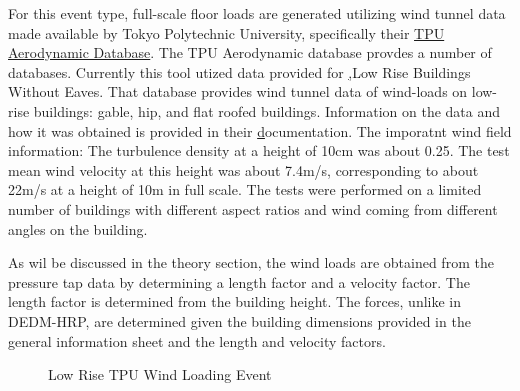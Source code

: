 
For this event type, full-scale floor loads are generated utilizing wind tunnel data made available by Tokyo Polytechnic University, specifically their \href{http://wind.arch.t-kougei.ac.jp/system/eng/contents/code/tpu}{TPU Aerodynamic Database}. The TPU Aerodynamic database provdes a number of databases. Currently this tool utized data provided for \href{http://www.wind.arch.t-kougei.ac.jp/info_center/windpressure/lowrise/mainpage.html},{Low Rise Buildings Without Eaves}. That database provides wind tunnel data of wind-loads on low-rise buildings: gable, hip, and flat roofed buildings. Information on the data and how it was obtained is provided in their \href{http://www.wind.arch.t-kougei.ac.jp/info_center/windpressure/lowrise/Introductionofthedatabase.pdf} documentation. The imporatnt wind field information: The turbulence density at a height of 10cm was about 0.25.  The test mean wind velocity at this height was about 7.4m/s, corresponding to about 22m/s at a height of 10m in full scale. The tests were performed on a limited number of buildings with different aspect ratios and wind coming from different angles on the building.

As wil be discussed in the theory section, the wind loads are obtained from the pressure tap data by determining a length factor and a velocity factor. The length factor is determined from the building height. The forces, unlike in DEDM-HRP, are determined given the building dimensions provided in the general information sheet and the length and velocity factors.

\begin{figure}[!htbp]
  \caption{Low Rise TPU Wind Loading Event}
  \label{fig:lowRiseTPU}
\end{figure}

